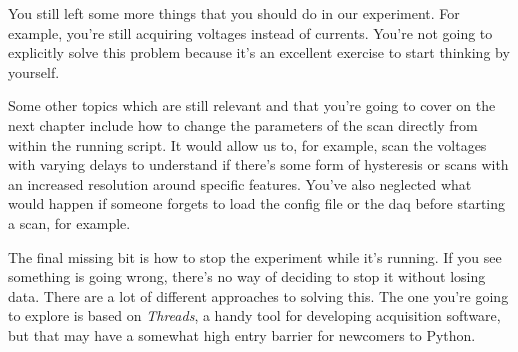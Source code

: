 You still left some more things that you should do in our experiment. For example, you're still acquiring voltages instead of currents. You're not going to explicitly solve this problem because it's an excellent exercise to start thinking by yourself.


Some other topics which are still relevant and that you're going to cover on the next chapter include how to change the parameters of the scan directly from within the running script. It would allow us to, for example, scan the voltages with varying delays to understand if there's some form of hysteresis or scans with an increased resolution around specific features. You've also neglected what would happen if someone forgets to load the config file or the daq before starting a scan, for example.

The final missing bit is how to stop the experiment while it's running. If you see something is going wrong, there's no way of deciding to stop it without losing data. There are a lot of different approaches to solving this. The one you're going to explore is based on \emph{Threads}, a handy tool for developing acquisition software, but that may have a somewhat high entry barrier for newcomers to Python.
